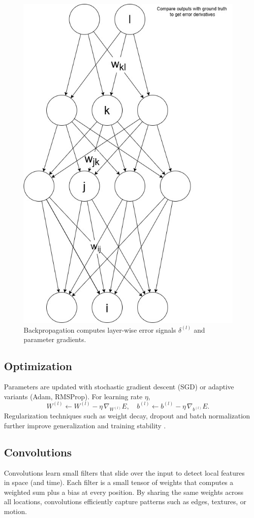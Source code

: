\begin{figure}[ht]
    \centering
    \includegraphics[width=0.6\linewidth]{figures/neural_net_back_prop.jpg}
    \caption{Backpropagation computes layer-wise error signals \(\delta^{(l)}\) and parameter gradients.}
    \label{fig:backward_pass}
\end{figure}

\subsection{Optimization}
Parameters are updated with stochastic gradient descent (SGD) or adaptive variants (Adam, RMSProp). For learning rate \(\eta\),
\[
W^{(l)} \leftarrow W^{(l)} - \eta\,\nabla_{W^{(l)}}E,
\quad
b^{(l)} \leftarrow b^{(l)} - \eta\,\nabla_{b^{(l)}}E.
\]
Regularization techniques such as weight decay, dropout and batch normalization further improve generalization and training stability \cite{ioffe_batch_2015}.

\subsection{Convolutions}

Convolutions learn small filters that slide over the input to detect local features in space (and time). Each filter is a small tensor of weights that computes a weighted sum plus a bias at every position. By sharing the same weights across all locations, convolutions efficiently capture patterns such as edges, textures, or motion.

